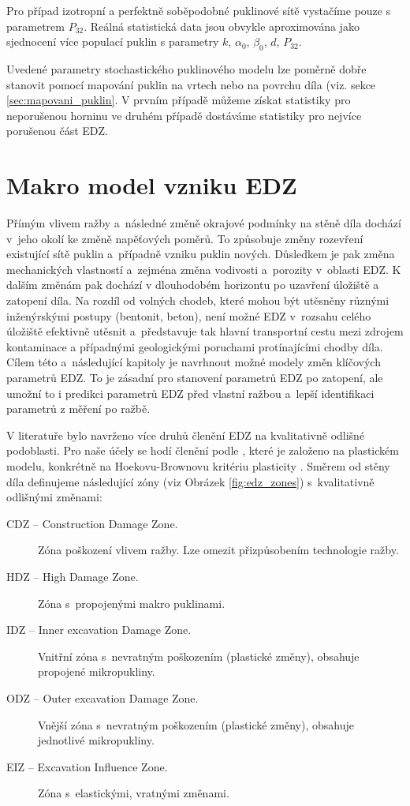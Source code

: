 \documentclass{article}
\begin{document}
Pro případ izotropní a perfektně soběpodobné puklinové sítě vystačíme pouze s parametrem $P_{32}$. Reálná statistická data jsou obvykle aproximována jako sjednocení více populací puklin s parametry 
$k$, $\alpha_0$, $\beta_0$, $d$, $P_{32}$.

Uvedené parametry stochastického puklinového modelu lze poměrně dobře stanovit pomocí mapování puklin na vrtech nebo na povrchu díla (viz. sekce \ref{sec:mapovani_puklin}. 
V prvním případě můžeme získat statistiky pro neporušenou horninu ve druhém případě dostáváme statistiky pro nejvíce porušenou část EDZ.

\section{Makro model vzniku EDZ}
\label{sec:model_EDZ}

Přímým vlivem ražby a~následné změně okrajové podmínky na stěně díla dochází v~jeho okolí ke změně napěťových poměrů. To způsobuje změny rozevření 
existující sítě puklin a~případně vzniku puklin nových. Důsledkem je pak změna mechanických vlastností a~zejména změna vodivosti
a~porozity v~oblasti EDZ. K dalším změnám pak dochází v dlouhodobém horizontu po uzavření úložiště a zatopení díla.
Na rozdíl od volných chodeb, které mohou být utěsněny různými inženýrskými postupy (bentonit, beton), není možné EDZ v~rozsahu celého úložiště efektivně utěsnit a~představuje tak hlavní transportní cestu mezi zdrojem kontaminace 
a případnými geologickými poruchami protínajícími chodby díla. 
Cílem této a~následující kapitoly je navrhnout možné modely změn klíčových parametrů EDZ. To je zásadní pro stanovení parametrů EDZ po zatopení, ale
umožní to i predikci parametrů EDZ před vlastní ražbou a~lepší identifikaci parametrů z měření po ražbě.

V literatuře bylo navrženo více druhů členění EDZ na kvalitativně odlišné podoblasti. Pro naše účely se hodí členění podle \cite{Perras2016}, 
které je založeno na plastickém modelu, konkrétně na Hoekovu-Brownovu kritériu plasticity \cite{Hoek2002}. Směrem od stěny díla definujeme následující zóny (viz Obrázek \ref{fig:edz_zones}) s~kvalitativně odlišnými změnami:
\begin{description}
\item[CDZ -- Construction Damage Zone.] Zóna poškození vlivem ražby. Lze omezit přizpůsobením technologie ražby.
\item[HDZ -- High Damage Zone.] Zóna s~propojenými makro puklinami. 
\item[IDZ -- Inner excavation Damage Zone.] Vnitřní zóna s~nevratným poškozením (plastické změny), obsahuje propojené mikropukliny.
\item[ODZ -- Outer excavation Damage Zone.] Vnější zóna s~nevratným poškozením (plastické změny), obsahuje jednotlivé mikropukliny.
\item[EIZ -- Excavation Influence Zone.] Zóna s~elastickými, vratnými změnami.
\end{description}
\end{document}
